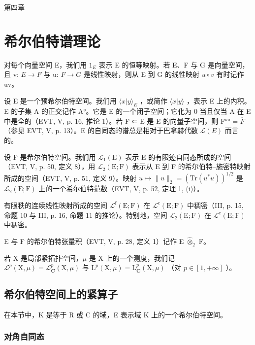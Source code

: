 第四章

\chapter{希尔伯特谱理论}
\setcounter{exercisepar}{0}

对每个向量空间 E，我们用 \(1_{E}\) 表示 E 的恒等映射。若 E、F 与 G 是向量空间，且 v: \(E \rightarrow F\) 与 u: \(F \rightarrow G\) 是线性映射，则从 E 到 G 的线性映射 \(u \circ v\) 有时记作 uv。

设 E 是一个预希尔伯特空间。我们用 \(\langle x|y\rangle_{E}\) ，或简作 \(\langle x|y\rangle\) ，表示 E 上的内积。E 的子集 A 的正交记作 A°。它是 E 的一个闭子空间；它化为 0 当且仅当 A 在 E 中是全的（EVT, V, p. 16, 推论 1）。若 F ⊂ E 是 E 的向量子空间，则 F°° = \(\overline{F}\) （参见 EVT, V, p. 13）。E 的自同态的谱总是相对于巴拿赫代数 \(\mathcal{L}(E)\) 而言的。

设 F 是希尔伯特空间。我们用 \(\mathcal{L}_1(\mathrm{E})\) 表示 E 的有限迹自同态所成的空间（EVT, V, p. 50, 定义 8），用 \(\mathcal{L}_2(\mathrm{E};\mathrm{F})\) 表示从 E 到 F 的希尔伯特–施密特映射所成的空间（EVT, V, p. 51, 定义 9）。映射 \(u\mapsto \| u\| _2 = (\mathrm{Tr}(u^{*}u))^{1 / 2}\) 是 \(\mathcal{L}_2(\mathrm{E};\mathrm{F})\) 上的一个希尔伯特范数（EVT, V, p. 52, 定理 1, (i)）。

有限秩的连续线性映射所成的空间 \(\mathcal{L}^{\mathrm{f}}(\mathrm{E};\mathrm{F})\) 在 \(\mathcal{L}^{\mathrm{c}}(\mathrm{E};\mathrm{F})\) 中稠密（III, p. 15, 命题 10 与 III, p. 16, 命题 11 的推论）。特别地，空间 \(\mathcal{L}_2(\mathrm{E};\mathrm{F})\) 在 \(\mathcal{L}^{\mathrm{c}}(\mathrm{E};\mathrm{F})\) 中稠密。

E 与 F 的希尔伯特张量积（EVT, V, p. 28, 定义 1）记作 E \(\widehat{\otimes}_2\) F。

若 X 是局部紧拓扑空间，\(\mu\) 是 X 上的一个测度，我们记 \(\mathcal{L}^{p}(\mathrm{X},\mu)=\mathcal{L}_{\mathbf{C}}^{p}(\mathrm{X},\mu)\) 与 \(\mathrm{L}^{p}(\mathrm{X},\mu)=\mathrm{L}_{\mathbf{C}}^{p}(\mathrm{X},\mu)\) （对 \(p\in[1,+\infty]\) ）。

\section{希尔伯特空间上的紧算子}

在本节中，K 是等于 R 或 C 的域，E 表示域 K 上的一个希尔伯特空间。

\subsection{对角自同态}

